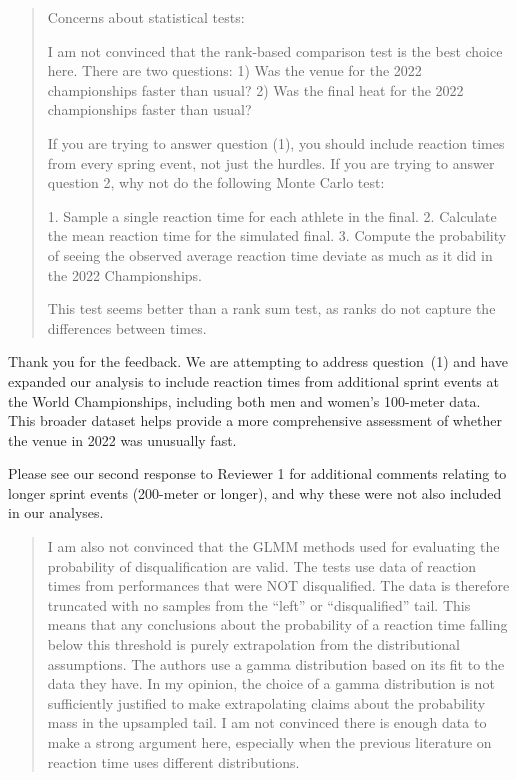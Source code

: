 \documentclass[12pt]{article}
\newenvironment{comment}%
{\begin{quotation}\noindent\small\it\color{darkblue}\ignorespaces%
}{\end{quotation}}
\begin{document}
\begin{comment}
Concerns about statistical tests:

I am not convinced that the rank-based comparison test is the best choice here.
There are two questions: 1) Was the venue for the 2022 championships faster than
usual? 2) Was the final heat for the 2022 championships faster than usual?

If you are trying to answer question (1), you should include reaction times from
every spring event, not just the hurdles. If you are trying to answer question
2, why not do the following Monte Carlo test:

1. Sample a single reaction time for each athlete in the final.
2. Calculate the mean reaction time for the simulated final.
3. Compute the probability of seeing the observed average reaction time deviate
as much as it did in the 2022 Championships.

This test seems better than a rank sum test, as ranks do not capture the
differences between times.

\end{comment}

Thank you for the feedback. We are attempting to address question~(1)
and have expanded our analysis to include reaction times from
additional sprint events at the World Championships, including both
men and women's 100-meter data. This broader dataset helps provide a
more comprehensive assessment of whether the venue in 2022 was
unusually fast. 

Please see our second response to Reviewer 1 for additional 
comments relating to longer sprint events (200-meter or longer), 
and why these were not also included in our analyses.



\begin{comment}
I am also not convinced that the GLMM methods used for evaluating the
probability of disqualification are valid. The tests use data of reaction times
from performances that were NOT disqualified.  The data is therefore truncated
with no samples from the “left” or “disqualified” tail. This means that any
conclusions about the probability of a reaction time falling below this
threshold is purely extrapolation from the distributional assumptions. The
authors use a gamma distribution based on its fit to the data they have. In my
opinion, the choice of a gamma distribution is not sufficiently justified to
make extrapolating claims about the probability mass in the upsampled tail. I am
not convinced there is enough data to make a strong argument here, especially
when the previous literature on reaction time uses different distributions.
\end{comment}
\end{document}
